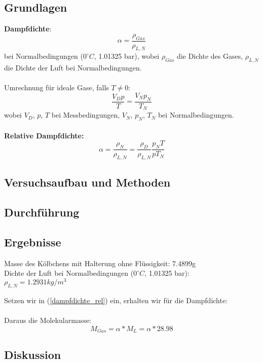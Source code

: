 \documentclass{article}
\begin{document}
\subsection{Grundlagen}
\textbf{Dampfdichte}: 
\begin{equation}
\label{dampfdichte_norm}
\alpha=\frac{\rho_{Gas}}{\rho_{L,N}}
\end{equation}
bei Normalbedingungen ($0^\circ C$, 1.01325 bar), wobei $\rho_{Gas}$ die Dichte des Gases, $\rho_{L,N}$ die Dichte der Luft bei Normalbedingungen.\\
\\
Umrechnung für ideale Gase, falls $T\neq 0$:
\begin{equation}
\frac{V_Dp}{T}=\frac{V_Np_N}{T_N}
\end{equation}
wobei $V_D$, $p$, $T$ bei Messbedingungen, $V_N$, $p_N$, $T_N$ bei Normalbedingungen.\\
\\
\textbf{Relative Dampfdichte:}
\begin{equation}
\label{dampfdichte_rel}
\alpha=\frac{\rho_N}{\rho_{L,N}}=\frac{\rho_D}{\rho_{L,N}}\frac{p_NT}{pT_N}
\end{equation}

\subsection{Versuchsaufbau und Methoden}
\subsection{Durchführung}
\subsection{Ergebnisse}

Masse des Kölbchens mit Halterung ohne Flüssigkeit: 7.4899g\\
Dichte der Luft bei Normalbedingungen ($0^\circ C$, 1.01325 bar):\\
$\rho_{L,N}=1.2931kg/m^3$

Setzen wir in (\ref{dampfdichte_rel}) ein, erhalten wir für die Dampfdichte:\\
\\
Daraus die Molekularmasse:\\
$$M_{Gas}=\alpha*M_L=\alpha*28.98$$

\subsection{Diskussion}
\end{document}
